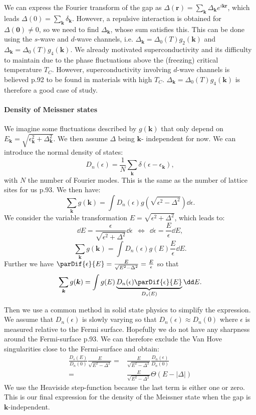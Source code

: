 \documentclass[../main.tex]{subfile}
\begin{document}
We can express the Fourier transform of the gap as $\Delta(\bm{r}) = \sum_{\bm{k}} \Delta_{\bm{k}} e^{i\bm{k}\bm{r}}$, which leads $\Delta(0) = \sum_{\bm{k}} \delta_{\bm{k}}$.
However, a repulsive interaction is obtained for $\Delta(\bm{0}) \neq 0$, so we need to find $\Delta_{\bm{k}}$, whose sum satisfies this. 
This can be done using the $s$-wave and $d$-wave channels, i.e. $\Delta_{\bm{k}} = \Delta_0(T)g_2(\bm{k})$ and $\Delta_{\bm{k}} = \Delta_0(T)g_4(\bm{k})$.
We already motivated superconductivity and its difficulty to maintain due to the phase fluctuations above the (freezing) critical temperature $T_C$. 
However, superconductivity involving $d$-wave channels is believed \cite{FossheimSudbo2004} p.92 to be found in materials with high $T_C$.
$\Delta_{\bm{k}} = \Delta_0(T)g_4(\bm{k})$ is therefore a good case of study.\\

\paragraph{Density of Meissner states} $~$\\

We imagine some fluctuations described by $g(\bm{k})$ 
that only depend on $E_{\bm{k}} = \sqrt{\epsilon_{\bm{k}}^2 + \Delta_{\bm{k}}^2}$. We then assume $\Delta$ being $\bm{k}$-
independent for now. We can introduce the normal density of states:
\[
    D_n(\epsilon) = \frac{1}{N} \sum_{\bm{k}} \delta(\epsilon - \epsilon_{\bm{k}}),
\]
with $N$ the number of Fourier modes. This is the same as the number of lattice sites for us \cite{FossheimSudbo2004} p.93.
We then have:
\[
    \sum_{\bm{k}} g(\bm{k})= \int D_n(\epsilon)g\left(\sqrt{\epsilon^2-\Delta^2}\right) \dd \epsilon.
\]
We consider the variable transformation $E = \sqrt{\epsilon^2 + \Delta^2}$, which leads to:
\[
    \dd E = \frac{\epsilon}{\sqrt{\epsilon^2 + \Delta^2}} \dd \epsilon ~~ \Longleftrightarrow ~~ \dd \epsilon = \frac{E}{\epsilon} \dd E,
\]
\[
    \sum_{\bm{k}} g(\bm{k})=\int D_n(\epsilon)g(E)\frac{E}{\epsilon} \dd E.
\]
Further we have $\parDif{\epsilon}{E} = \frac{E}{\sqrt{E^2-\Delta^2}} =\frac{E}{\epsilon} $ so that
\[
    \sum_{\bm{k}} g(\bm{k}) = \int g(E)\underbrace{D_n(\epsilon)\parDif{\epsilon}{E}}_{D_s(E)} \dd E.
\]

Then we use a common method in solid state physics to simplify the expression. We assume that $D_n(\epsilon)$ is slowly varying so that $D_n(\epsilon)\approx D_n(0)$
where $\epsilon$ is measured relative to the Fermi surface. Hopefully we do not have any sharpness around the Fermi-surface \cite{FossheimSudbo2004} p.93. 
We can therefore exclude the Van Hove singularities close to the Fermi-surface and obtain:
\begin{align*}
    \frac{D_s(E)}{D_n(0)} \frac{E}{\sqrt{E^2-\Delta^2}} =& \frac{E}{\sqrt{E^2-\Delta^2}}\frac{D_n(\epsilon)}{D_n(0)}\\
    =&\frac{E}{\sqrt{E^2-\Delta^2}} \Theta (E- |\Delta|)
\end{align*}
We use the Heaviside step-function because the last term is either one or zero. This is our final expression for the density of the Meissner 
state when the gap is $\bm{k}$-independent.\\
\end{document}

